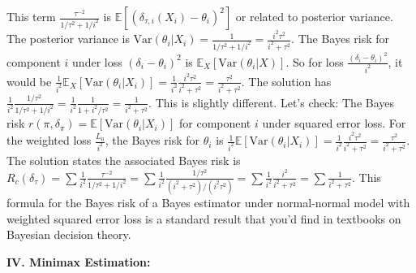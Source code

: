 \begin{enumerate}
\begin{itemize}
This term $\frac{\tau^{-2}}{1/\tau^2+1/i^2}$ is $\mathbb{E}[(\delta_{\tau,i}(X_i)-\theta_i)^2]$ or related to posterior variance.
The posterior variance is $\text{Var}(\theta_i|X_i) = \frac{1}{1/\tau^2 + 1/i^2} = \frac{i^2\tau^2}{i^2+\tau^2}$.
The Bayes risk for component $i$ under loss $(\delta_i - \theta_i)^2$ is $\mathbb{E}_X[\text{Var}(\theta_i|X)]$.
So for loss $\frac{(\delta_i - \theta_i)^2}{i^2}$, it would be $\frac{1}{i^2} \mathbb{E}_X[\text{Var}(\theta_i|X_i)] = \frac{1}{i^2} \frac{i^2\tau^2}{i^2+\tau^2} = \frac{\tau^2}{i^2+\tau^2}$.
The solution has $\frac{1}{i^2} \frac{1/\tau^2}{1/\tau^2+1/i^2} = \frac{1}{i^2} \frac{1}{1+i^2/\tau^2} = \frac{1}{i^2+\tau^2}$. This is slightly different.
Let's check: The Bayes risk $r(\pi, \delta_\pi) = \mathbb{E}[\text{Var}(\theta_i|X_i)]$ for component $i$ under squared error loss.
For the weighted loss $\frac{L_0}{i^2}$, the Bayes risk for $\theta_i$ is $\frac{1}{i^2}\mathbb{E}[\text{Var}(\theta_i|X_i)] = \frac{1}{i^2}\frac{i^2 \tau^2}{i^2+\tau^2} = \frac{\tau^2}{i^2+\tau^2}$.
The solution states the associated Bayes risk is $R_c(\delta_\tau) = \sum \frac{1}{i^2} \frac{\tau^{-2}}{1/\tau^2+1/i^2} = \sum \frac{1}{i^2} \frac{1/\tau^2}{(i^2+\tau^2)/(i^2\tau^2)} = \sum \frac{1}{i^2} \frac{i^2}{i^2+\tau^2} = \sum \frac{1}{i^2+\tau^2}$.
This formula for the Bayes risk of a Bayes estimator under normal-normal model with weighted squared error loss is a standard result that you'd find in textbooks on Bayesian decision theory.
	\end{itemize}
\end{enumerate}

\textbf{IV. Minimax Estimation:}

